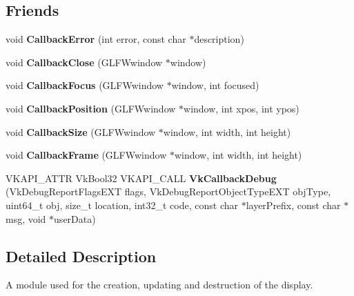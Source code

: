 \subsection*{Friends}
\begin{DoxyCompactItemize}
\item 
\mbox{\label{class_flounder_1_1_display_a7aa412c017a82e11cd6358ec17e2f866}} 
void {\bfseries Callback\+Error} (int error, const char $\ast$description)
\item 
\mbox{\label{class_flounder_1_1_display_aa84cdbe8da6e49d21c4a54d3f8cdd83c}} 
void {\bfseries Callback\+Close} (G\+L\+F\+Wwindow $\ast$window)
\item 
\mbox{\label{class_flounder_1_1_display_aaad19961e56b24e7186ccc649f32d6c7}} 
void {\bfseries Callback\+Focus} (G\+L\+F\+Wwindow $\ast$window, int focused)
\item 
\mbox{\label{class_flounder_1_1_display_acd79ca63b187efb347352e120ffa52cf}} 
void {\bfseries Callback\+Position} (G\+L\+F\+Wwindow $\ast$window, int xpos, int ypos)
\item 
\mbox{\label{class_flounder_1_1_display_a90b7441f8c089933b044ffeacd6b815d}} 
void {\bfseries Callback\+Size} (G\+L\+F\+Wwindow $\ast$window, int width, int height)
\item 
\mbox{\label{class_flounder_1_1_display_a7d789ae5d7fdd92ccaf70839331c9115}} 
void {\bfseries Callback\+Frame} (G\+L\+F\+Wwindow $\ast$window, int width, int height)
\item 
\mbox{\label{class_flounder_1_1_display_af48f9f6659434547f06c70d7f3234a06}} 
V\+K\+A\+P\+I\+\_\+\+A\+T\+TR Vk\+Bool32 V\+K\+A\+P\+I\+\_\+\+C\+A\+LL {\bfseries Vk\+Callback\+Debug} (Vk\+Debug\+Report\+Flags\+E\+XT flags, Vk\+Debug\+Report\+Object\+Type\+E\+XT obj\+Type, uint64\+\_\+t obj, size\+\_\+t location, int32\+\_\+t code, const char $\ast$layer\+Prefix, const char $\ast$msg, void $\ast$user\+Data)
\end{DoxyCompactItemize}


\subsection{Detailed Description}
A module used for the creation, updating and destruction of the display. 



